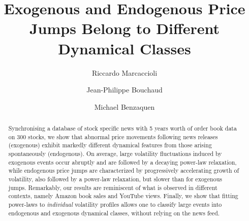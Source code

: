 \documentclass[amsmath,amssymb,aps,pre,floatfix,twocolumn,superscriptaddress]{revtex4}
\begin{document}
\title{Exogenous and Endogenous Price Jumps Belong to Different Dynamical Classes}

\author{Riccardo Marcaccioli}

\author{Jean-Philippe Bouchaud}

\author{Michael Benzaquen}


\begin{abstract}
Synchronising a database of stock specific news with 5 years worth of order book data on 300 stocks, %
we show that abnormal price movements following news releases (exogenous) exhibit markedly different dynamical features from those arising spontaneously (endogenous). On average, large volatility fluctuations induced by exogenous events occur abruptly and are followed by a decaying power-law relaxation, while endogenous price jumps are characterized by progressively accelerating growth of volatility, also followed by a power-law relaxation, but slower than for exogenous jumps. 
Remarkably, our results are reminiscent of what is observed in different contexts, namely Amazon book sales and YouTube views. Finally, we show that fitting power-laws to {\it individual} volatility profiles allows one to classify large events into endogenous and exogenous dynamical classes, without relying on the news feed.
\end{abstract}

\maketitle
\end{document}
